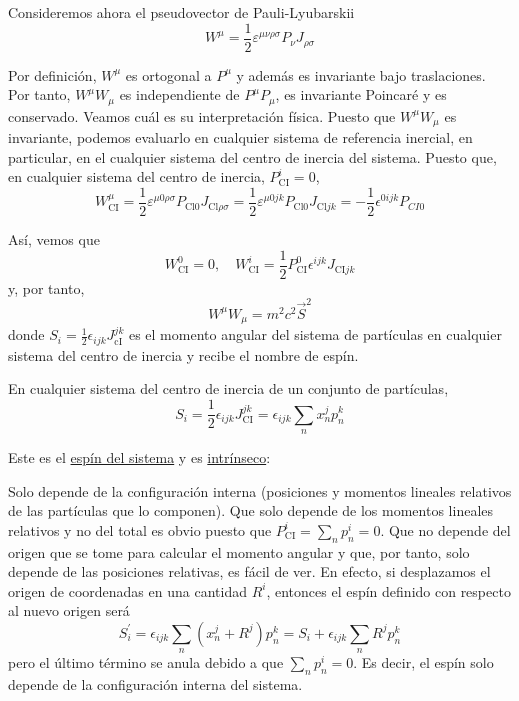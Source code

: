 \begin{example}
  Consideremos ahora el pseudovector de Pauli-Lyubarskii
  $$
W^{\mu}=\frac{1}{2} \varepsilon^{\mu \nu \rho \sigma} P_{\nu} J_{\rho \sigma}
$$

Por definición, $W^{\mu}$ es ortogonal a $P^{\mu}$ y además es invariante bajo traslaciones. Por tanto, $W^{\mu} W_{\mu}$ es independiente de $P^{\mu} P_{\mu}$, es invariante Poincaré y es conservado. Veamos cuál es su interpretación física. Puesto que $W^{\mu} W_{\mu}$ es invariante, podemos evaluarlo en cualquier sistema de referencia inercial, en particular, en el cualquier sistema del centro de inercia del sistema. Puesto que, en cualquier sistema del centro de inercia, $P_{\mathrm{CI}}^{i}=0$,
$$
W_{\mathrm{CI}}^{\mu}=\frac{1}{2} \varepsilon^{\mu 0 \rho \sigma} P_{\mathrm{Cl} 0} J_{\mathrm{Cl} \rho \sigma}=\frac{1}{2} \varepsilon^{\mu 0 j k} P_{\mathrm{Cl} 0} J_{\mathrm{Cl} j k}=-\frac{1}{2}\epsilon^{0ijk}P_{CI0}
$$

Así, vemos que
$$
W_{\mathrm{CI}}^{0}=0, \quad W_{\mathrm{CI}}^{i}=\frac{1}{2} P_{\mathrm{CI}}^{0} \epsilon^{i j k} J_{\mathrm{CI} j k}
$$
y, por tanto,
$$
W^{\mu} W_{\mu}=m^{2} c^{2} \vec{S}^{2}
$$
donde $S_{i}=\frac{1}{2} \epsilon_{i j k} J_{\mathrm{cI}}^{j k}$ es el momento angular del sistema de partículas en cualquier sistema del centro de inercia y recibe el nombre de espín.

En cualquier sistema del centro de inercia de un conjunto de partículas,
$$
S_{i}=\frac{1}{2} \epsilon_{i j k} J_{\mathrm{CI}}^{j k}=\epsilon_{i j k} \sum_{n} x_{n}^{j} p_{n}^{k}
$$

Este es el \underline{espín del sistema} y es \underline{intrínseco}: 

Solo depende de la configuración interna (posiciones y momentos lineales relativos de las partículas que lo componen). Que solo depende de los momentos lineales relativos y no del total es obvio puesto que $P_{\mathrm{CI}}^{i}=\sum_{n} p_{n}^{i}=0$. Que no depende del origen que se tome para calcular el momento angular y que, por tanto, solo depende de las posiciones relativas, es fácil de ver. En efecto, si desplazamos el origen de coordenadas en una cantidad $R^{i}$, entonces el espín definido con respecto al nuevo origen será
$$
S_{i}^{\prime}=\epsilon_{i j k} \sum_{n}\left(x_{n}^{j}+R^{j}\right) p_{n}^{k}=S_{i}+\epsilon_{i j k} \sum_{n} R^{j} p_{n}^{k}
$$
pero el último término se anula debido a que $\sum_{n} p_{n}^{i}=0$. Es decir, el espín solo depende de la configuración interna del sistema.

\end{example}

